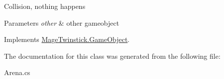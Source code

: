 Collision, nothing happens 


\begin{DoxyParams}{Parameters}
{\em other} & other gameobject\\
\hline
\end{DoxyParams}


Implements \hyperlink{class_mage_twinstick_1_1_game_object_a60f894a5ff911af7bfe3e4bd8abf253f}{Mage\+Twinstick.\+Game\+Object}.



The documentation for this class was generated from the following file\+:\begin{DoxyCompactItemize}
\item 
Arena.\+cs\end{DoxyCompactItemize}

